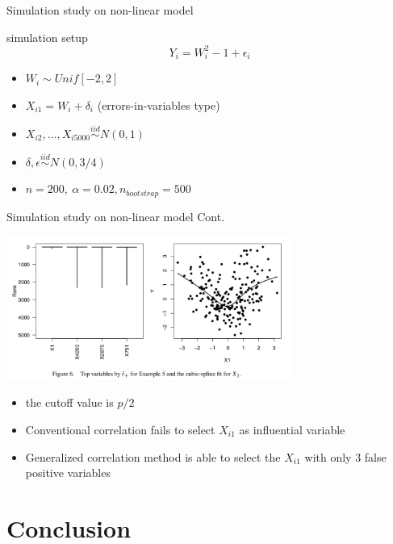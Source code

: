 \documentclass[ignorenonframetext,]{beamer}
\providecommand{\tightlist}{%
  \setlength{\itemsep}{0pt}\setlength{\parskip}{0pt}}
\begin{document}
\begin{frame}{Simulation study on non-linear model}

\begin{block}{simulation setup} 
\[
  Y_i = W^2_i -1 + \epsilon_i
\]
\end{block}

\begin{itemize}
\tightlist
\item
  \(W_i \sim Unif[-2,2]\)
\item
  \(X_{i1} = W_{i} + \delta_i\) (errors-in-variables type)
\item
  \(X_{i2}, \dots, X_{i5000} \stackrel{iid}{\sim} N(0,1)\)
\item
  \(\delta, \epsilon \stackrel{iid}{\sim} N(0, 3/4)\)
\item
  \(n = 200, ~ \alpha = 0.02, n_{bootstrap} = 500\)
\end{itemize}

\end{frame}

\begin{frame}{Simulation study on non-linear model Cont.}

\includegraphics[width=0.70000\textwidth]{./figure/sim_non_linear.png}

\begin{itemize}
\tightlist
\item
  the cutoff value is \(p/2\)\\
\item
  Conventional correlation fails to select \(X_{i1}\) as influential
  variable\\
\item
  Generalized correlation method is able to select the \(X_{i1}\) with
  only 3 false positive variables
\end{itemize}

\end{frame}

\section{Conclusion}\label{conclusion}
\end{document}
